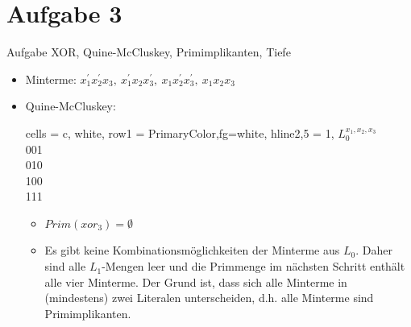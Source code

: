 
\section{Aufgabe 3}

\setcounter{exercise}{1}

\begin{frame}[allowframebreaks]{Aufgabe \thesection}{XOR, Quine-McCluskey, Primimplikanten, Tiefe}
  \begin{solutionnoinc}
    \begin{itemize}
      \item \alert{Minterme:} $x_{1}^{\prime}x_{2}^{\prime}x_{3},\ x_{1}^{\prime}x_{2}x_{3}^{\prime},\ x_{1}x_{2}^{\prime}x_{3}^{\prime},\ x_{1}x_{2}x_{3}$
      \item \alert{Quine-McCluskey:}
        \begin{table}
        \centering
        \begin{tblr}{
          cells = {c, white},
          row{1} = {PrimaryColor,fg=white},
          hline{2,5} = {1}{},
        }
        $L_{0}^{x_1, x_2, x_3}$ \\
        001                     \\
        010                     \\
        100                     \\
        111                     
        \end{tblr}
        \end{table}
        \begin{itemize}
          \item $Prim(xor_3) = \emptyset$
          \item Es gibt keine Kombinationsmöglichkeiten der Minterme aus $L_0$. Daher sind alle $L_1$-Mengen leer und die Primmenge im nächsten Schritt enthält alle vier Minterme. Der Grund ist, dass sich alle Minterme in (mindestens) zwei Literalen unterscheiden, d.h. alle Minterme sind Primimplikanten.
        \end{itemize}
    \end{itemize}
  \end{solutionnoinc}
  \begin{solution}
    \begin{table}
      \centering
      \begin{tblr}{
}
\end{tblr}
\end{table}
\end{solution}
\end{frame}
